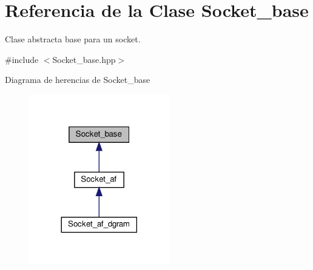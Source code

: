 \hypertarget{classSocket__base}{}\section{Referencia de la Clase Socket\+\_\+base}
\label{classSocket__base}


Clase abstracta base para un socket.  




{\ttfamily \#include $<$Socket\+\_\+base.\+hpp$>$}



Diagrama de herencias de Socket\+\_\+base\nopagebreak
\begin{figure}[H]
\begin{center}
\leavevmode
\includegraphics[width=173pt]{classSocket__base__inherit__graph}
\end{center}
\end{figure}
